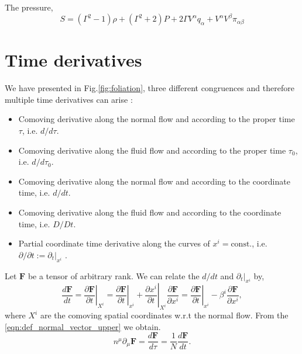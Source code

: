 The pressure,
\begin{equation}
    S=(\Gamma^2-1)\rho + (\Gamma^2+2)P+2\Gamma V^\alpha q_\alpha + V^\alpha V^\beta \pi_{\alpha\beta}
    \label{eqn:general_shear_fluid_normal}
\end{equation}

\section{Time derivatives}


We have presented in Fig.\eqref{fig:foliation}, three different congruences and therefore multiple time derivatives can arise \cite{Buchert_2020}:
\begin{itemize}
    \item Comoving derivative along the normal flow and according to the proper time $\tau$, i.e. $d/d\tau$.
    \item Comoving derivative along the fluid flow and according to the proper time $\tau_0$, i.e. $d/d\tau_0$.
    \item Comoving derivative along the normal flow and according to the coordinate time, i.e. $d/dt$.
    \item Comoving derivative along the fluid flow and according to the coordinate time, i.e. $D/Dt$.
    \item Partial coordinate time derivative along the curves of $x^i=\text{const.}$, i.e. $\partial/\partial t:=\partial_t|_{x^i}$ .
\end{itemize}

Let $\mathbf{F}$ be a tensor of arbitrary rank. We can relate the $d/dt$ and $\partial_t|_{x^i}$ by,
\begin{equation}
    \frac{d\mathbf{F}}{dt}=\left.\frac{\partial \mathbf{F}}{\partial t}\right|_{X^i}=\left.\frac{\partial \mathbf{F}}{\partial t}\right|_{x^i}+\left.\frac{\partial x^i}{\partial t}\right|_{X^i}\frac{\partial \mathbf{F}}{\partial x^i}=\left.\frac{\partial \mathbf{F}}{\partial t}\right|_{x^i}-\beta^i\frac{\partial \mathbf{F}}{\partial x^i},
    \label{eqn:normal_total_time_expression}
\end{equation}
where $X^i$ are the comoving spatial coordinates w.r.t the normal flow. From the \cref{eqn:def_normal_vector_upper} we obtain.
\begin{equation}
    n^\mu\partial_\mu \mathbf{F}=\frac{d\mathbf{F}}{d\tau}=\frac{1}{N}\frac{d\mathbf{F}}{dt}.
    \label{eqn:relation_total_time_normal_vec}
\end{equation}

